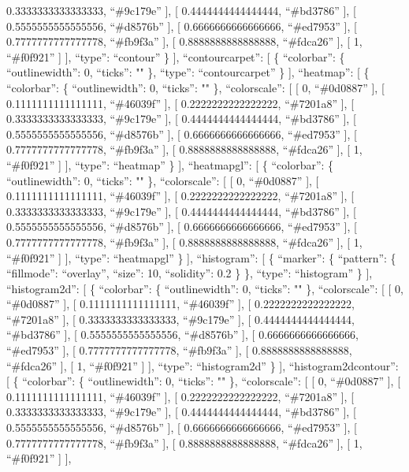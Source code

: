 \documentclass[
]{article}
\begin{document}
0.3333333333333333, ``\#9c179e'' {]}, {[} 0.4444444444444444,
``\#bd3786'' {]}, {[} 0.5555555555555556, ``\#d8576b'' {]}, {[}
0.6666666666666666, ``\#ed7953'' {]}, {[} 0.7777777777777778,
``\#fb9f3a'' {]}, {[} 0.8888888888888888, ``\#fdca26'' {]}, {[} 1,
``\#f0f921'' {]} {]}, ``type'': ``contour'' \} {]}, ``contourcarpet'':
{[} \{ ``colorbar'': \{ ``outlinewidth'': 0, ``ticks'': "" \}, ``type'':
``contourcarpet'' \} {]}, ``heatmap'': {[} \{ ``colorbar'': \{
``outlinewidth'': 0, ``ticks'': "" \}, ``colorscale'': {[} {[} 0,
``\#0d0887'' {]}, {[} 0.1111111111111111, ``\#46039f'' {]}, {[}
0.2222222222222222, ``\#7201a8'' {]}, {[} 0.3333333333333333,
``\#9c179e'' {]}, {[} 0.4444444444444444, ``\#bd3786'' {]}, {[}
0.5555555555555556, ``\#d8576b'' {]}, {[} 0.6666666666666666,
``\#ed7953'' {]}, {[} 0.7777777777777778, ``\#fb9f3a'' {]}, {[}
0.8888888888888888, ``\#fdca26'' {]}, {[} 1, ``\#f0f921'' {]} {]},
``type'': ``heatmap'' \} {]}, ``heatmapgl'': {[} \{ ``colorbar'': \{
``outlinewidth'': 0, ``ticks'': "" \}, ``colorscale'': {[} {[} 0,
``\#0d0887'' {]}, {[} 0.1111111111111111, ``\#46039f'' {]}, {[}
0.2222222222222222, ``\#7201a8'' {]}, {[} 0.3333333333333333,
``\#9c179e'' {]}, {[} 0.4444444444444444, ``\#bd3786'' {]}, {[}
0.5555555555555556, ``\#d8576b'' {]}, {[} 0.6666666666666666,
``\#ed7953'' {]}, {[} 0.7777777777777778, ``\#fb9f3a'' {]}, {[}
0.8888888888888888, ``\#fdca26'' {]}, {[} 1, ``\#f0f921'' {]} {]},
``type'': ``heatmapgl'' \} {]}, ``histogram'': {[} \{ ``marker'': \{
``pattern'': \{ ``fillmode'': ``overlay'', ``size'': 10, ``solidity'':
0.2 \} \}, ``type'': ``histogram'' \} {]}, ``histogram2d'': {[} \{
``colorbar'': \{ ``outlinewidth'': 0, ``ticks'': "" \}, ``colorscale'':
{[} {[} 0, ``\#0d0887'' {]}, {[} 0.1111111111111111, ``\#46039f'' {]},
{[} 0.2222222222222222, ``\#7201a8'' {]}, {[} 0.3333333333333333,
``\#9c179e'' {]}, {[} 0.4444444444444444, ``\#bd3786'' {]}, {[}
0.5555555555555556, ``\#d8576b'' {]}, {[} 0.6666666666666666,
``\#ed7953'' {]}, {[} 0.7777777777777778, ``\#fb9f3a'' {]}, {[}
0.8888888888888888, ``\#fdca26'' {]}, {[} 1, ``\#f0f921'' {]} {]},
``type'': ``histogram2d'' \} {]}, ``histogram2dcontour'': {[} \{
``colorbar'': \{ ``outlinewidth'': 0, ``ticks'': "" \}, ``colorscale'':
{[} {[} 0, ``\#0d0887'' {]}, {[} 0.1111111111111111, ``\#46039f'' {]},
{[} 0.2222222222222222, ``\#7201a8'' {]}, {[} 0.3333333333333333,
``\#9c179e'' {]}, {[} 0.4444444444444444, ``\#bd3786'' {]}, {[}
0.5555555555555556, ``\#d8576b'' {]}, {[} 0.6666666666666666,
``\#ed7953'' {]}, {[} 0.7777777777777778, ``\#fb9f3a'' {]}, {[}
0.8888888888888888, ``\#fdca26'' {]}, {[} 1, ``\#f0f921'' {]} {]},
\end{document}

